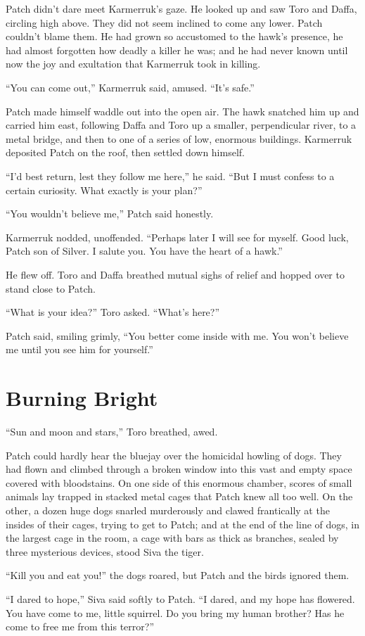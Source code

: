 \documentclass[ebook,oneside,openany,17pt]{memoir}
\renewcommand{\thechapter}{\Roman{chapter}}
\newcounter{sections}
\newcommand{\sections}[1]{%
  \section*{#1}
  \addtocounter{sections}{1}%
  \pdfbookmark[1]{#1}{section.\thechapter.\thesections}}
\begin{document}
Patch didn’t dare meet Karmerruk’s gaze. He looked up and saw Toro and
Daffa, circling high above. They did not seem inclined to come any
lower. Patch couldn’t blame them. He had grown so accustomed to the
hawk’s presence, he had almost forgotten how deadly a killer he was;
and he had never known until now the joy and exultation that Karmerruk
took in killing.

“You can come out,” Karmerruk said, amused. “It’s safe.”

Patch made himself waddle out into the open air. The hawk snatched him
up and carried him east, following Daffa and Toro up a smaller,
perpendicular river, to a metal bridge, and then to one of a series of
low, enormous buildings. Karmerruk deposited Patch on the roof, then
settled down himself.

“I’d best return, lest they follow me here,” he said. “But I must
confess to a certain curiosity. What exactly is your plan?”

“You wouldn’t believe me,” Patch said honestly.

Karmerruk nodded, unoffended. “Perhaps later I will see for
myself. Good luck, Patch son of Silver. I salute you. You have the
heart of a hawk.”

He flew off. Toro and Daffa breathed mutual sighs of relief and hopped
over to stand close to Patch.

“What is your idea?” Toro asked. “What’s here?”

Patch said, smiling grimly, “You better come inside with me. You won’t
believe me until you see him for yourself.”


\sections{Burning Bright}

“Sun and moon and stars,” Toro breathed, awed.

Patch could hardly hear the bluejay over the homicidal howling of
dogs. They had flown and climbed through a broken window into this
vast and empty space covered with bloodstains. On one side of this
enormous chamber, scores of small animals lay trapped in stacked metal
cages that Patch knew all too well. On the other, a dozen huge dogs
snarled murderously and clawed frantically at the insides of their
cages, trying to get to Patch; and at the end of the line of dogs, in
the largest cage in the room, a cage with bars as thick as branches,
sealed by three mysterious devices, stood Siva the tiger.

“Kill you and eat you!” the dogs roared, but Patch and the birds
ignored them.

“I dared to hope,” Siva said softly to Patch. “I dared, and my hope
has flowered. You have come to me, little squirrel. Do you bring my
human brother? Has he come to free me from this terror?”
\end{document}
